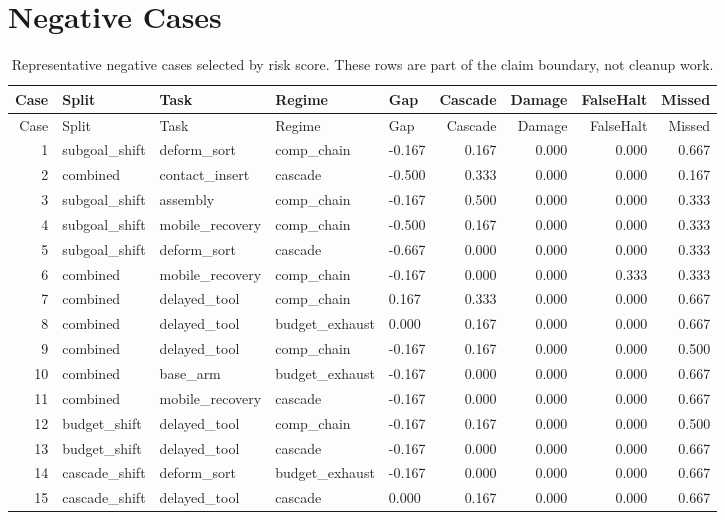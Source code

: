 \documentclass{article}
\begin{document}
\section{Negative Cases}
\begin{longtable}{@{}rllllrrrr@{}}
\caption{Representative negative cases selected by risk score. These rows are part of the claim boundary, not cleanup work.}\\
\toprule
Case & Split & Task & Regime & Gap & Cascade & Damage & FalseHalt & Missed\\
\midrule
\endfirsthead
\toprule
Case & Split & Task & Regime & Gap & Cascade & Damage & FalseHalt & Missed\\
\midrule
\endhead
1 & subgoal\_shift & deform\_sort & comp\_chain & -0.167 & 0.167 & 0.000 & 0.000 & 0.667 \\
2 & combined & contact\_insert & cascade & -0.500 & 0.333 & 0.000 & 0.000 & 0.167 \\
3 & subgoal\_shift & assembly & comp\_chain & -0.167 & 0.500 & 0.000 & 0.000 & 0.333 \\
4 & subgoal\_shift & mobile\_recovery & comp\_chain & -0.500 & 0.167 & 0.000 & 0.000 & 0.333 \\
5 & subgoal\_shift & deform\_sort & cascade & -0.667 & 0.000 & 0.000 & 0.000 & 0.333 \\
6 & combined & mobile\_recovery & comp\_chain & -0.167 & 0.000 & 0.000 & 0.333 & 0.333 \\
7 & combined & delayed\_tool & comp\_chain & 0.167 & 0.333 & 0.000 & 0.000 & 0.667 \\
8 & combined & delayed\_tool & budget\_exhaust & 0.000 & 0.167 & 0.000 & 0.000 & 0.667 \\
9 & combined & delayed\_tool & comp\_chain & -0.167 & 0.167 & 0.000 & 0.000 & 0.500 \\
10 & combined & base\_arm & budget\_exhaust & -0.167 & 0.000 & 0.000 & 0.000 & 0.667 \\
11 & combined & mobile\_recovery & cascade & -0.167 & 0.000 & 0.000 & 0.000 & 0.667 \\
12 & budget\_shift & delayed\_tool & comp\_chain & -0.167 & 0.167 & 0.000 & 0.000 & 0.500 \\
13 & budget\_shift & delayed\_tool & cascade & -0.167 & 0.000 & 0.000 & 0.000 & 0.667 \\
14 & cascade\_shift & deform\_sort & budget\_exhaust & -0.167 & 0.000 & 0.000 & 0.000 & 0.667 \\
15 & cascade\_shift & delayed\_tool & cascade & 0.000 & 0.167 & 0.000 & 0.000 & 0.667 \\

\end{longtable}
\end{document}
